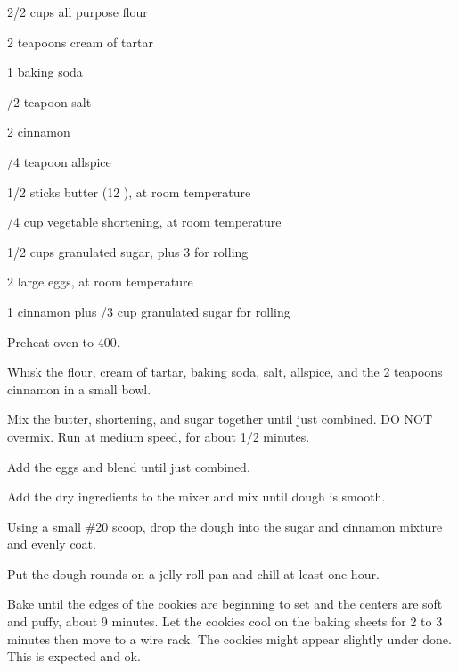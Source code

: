 %
%
%
%
\newpage




\begin{IngredientsAndSteps}
    \ListIngredientsAndSteps
    {
        2/2 cups all purpose flour

        2 teapoons cream of tartar

        1 \tsp baking soda

        /2 teapoon salt

        2 \tsp[s] cinnamon

        /4 teapoon allspice

        \IngredientsSeparatorClear

        1/2 sticks butter (12 \Tbl[s]), at room temperature

        /4 cup vegetable shortening, at room temperature

        1/2 cups granulated sugar, plus 3 \Tbl[s] for rolling

        2 large eggs, at room temperature

        1 \Tbl cinnamon plus /3 cup granulated sugar for rolling

    }
    {
        Preheat oven to 400\Degrees[F].

        Whisk the flour, cream of tartar, baking soda, salt, allspice, and the 2 teapoons cinnamon
        in a small bowl.

        Mix the butter, shortening, and sugar together until just combined. DO NOT overmix. Run at
        medium speed, for about 1/2 minutes.

        Add the eggs and blend until just combined.

        Add the dry ingredients to the mixer and mix until dough is smooth.

        Using a small \#20 scoop, drop the dough into the sugar and cinnamon mixture and
        evenly coat.

        Put the dough rounds on a jelly roll pan and chill at least one hour.

        Bake until the edges of the cookies are beginning to set and the centers are soft
        and puffy, about 9 minutes. Let the cookies cool on the baking sheets for 2 to 3
        minutes then move to a wire rack. The cookies might appear slightly under done. This
        is expected and ok.
    }
\end{IngredientsAndSteps}

